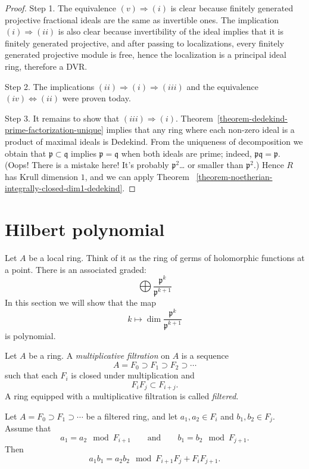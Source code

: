 \begin{proof}
Step 1. The equivalence $(v)\Rightarrow(i)$
is clear because finitely generated
projective fractional ideals are the same
as invertible ones.
The implication $(i)\Rightarrow(ii)$ is
also clear because invertibility of the
ideal implies that it is finitely
generated projective, and after passing
to localizations, every finitely generated
projective module is free, hence the
localization is a principal ideal ring,
therefore a DVR.

Step 2. The implications $(ii)\Rightarrow(i)
\Rightarrow(iii)$ and the equivalence
$(iv)\Leftrightarrow(ii)$ were proven
today.

Step 3. It remains to show that
$(iii)\Rightarrow(i)$.
Theorem~\ref{theorem-dedekind-prime-factorization-unique}
implies that any ring where each non-zero
ideal is a product of maximal ideals is
Dedekind.
From the uniqueness of decomposition we
obtain that $\mathfrak{p}\subset \mathfrak{q}$
implies $\mathfrak{p}=\mathfrak{q}$ when
both ideals are prime; indeed,
$\mathfrak{p}\mathfrak{q}=\mathfrak{p}$.
(Oops! There is a mistake here!
It's probably $\mathfrak{p}^2$…
or smaller than $\mathfrak{p}^2$.)
Hence $R$ has Krull dimension $1$, and we
can apply Theorem~
\ref{theorem-noetherian-integrally-closed-dim1-dedekind}.
\end{proof}

\section{Hilbert polynomial}
\label{section-hilbert-polynomial}

\noindent
Let $A$ be a local ring.
Think of it as the ring of
germs of holomorphic functions at a point.
There is an associated graded:
$$
\bigoplus \frac{\mathfrak{p}^k}{
\mathfrak{p}^{k+1}}
$$
In this section we will show that the map
$$
k \mapsto \dim \frac{\mathfrak{p}^k}{
\mathfrak{p}^{k+1}}
$$
is polynomial.

\begin{definition}
\label{definition-filtered-ring}
Let $A$ be a ring.
A {\it multiplicative filtration} on $A$ is
a sequence
$$
A=F_0\supset F_1\supset F_2\supset \cdots
$$
such that each $F_i$ is closed under
multiplication and
$$
F_iF_j\subset F_{i+j}.
$$
A ring equipped with a multiplicative
filtration is called {\it filtered}.
\end{definition}

\begin{lemma}
\label{lemma-associated-graded-ring}
Let $A=F_0\supset F_1\supset\cdots$
be a filtered ring, and let
$a_1,a_2\in F_i$ and $b_1,b_2\in F_j$.
Assume that
$$
a_1=a_2 \mod F_{i+1}
\qquad\text{and}\qquad
b_1=b_2 \mod F_{j+1}.
$$
Then
$$
a_1b_1=a_2b_2 \mod
F_{i+1}F_j+F_iF_{j+1}.
$$
\end{lemma}

